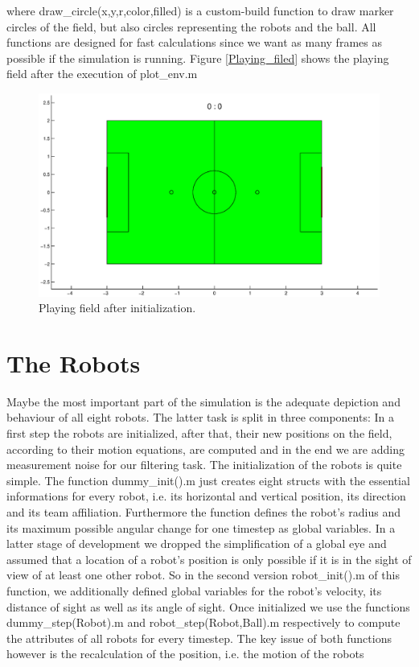 
\parskip 20pt

where {\selectfont draw\_circle(x,y,r,color,filled)} is a custom-build function to draw marker circles of the field, but also circles representing the robots and the ball. All functions are designed for fast calculations since we want as many frames as possible if the simulation is running. Figure \ref{Playing_filed} shows the playing field after the execution of {\selectfont plot\_env.m}
\parskip 10pt

\begin{figure}[htbp]
	\centering
    	\includegraphics[width=12cm]{./2_Simulation/playing_field}
  	\caption{Playing field after initialization.}
  	\label{Playing_field}
\end{figure}


\section{The Robots}

Maybe the most important part of the simulation is the adequate depiction and behaviour of all eight robots. The latter task is split in three components: In a first step the robots are initialized, after that, their new positions on the field, according to their motion equations, are computed and in the end we are adding measurement noise for our filtering task. The initialization of the robots is quite simple. The function {\selectfont dummy\_init().m} just creates eight structs with the essential informations for every robot, i.e. its horizontal and vertical position, its direction and its team affiliation. Furthermore the function defines the robot's radius and its maximum possible angular change for one timestep as global variables. In a latter stage of development we dropped the simplification of a global eye and assumed that a location of a robot's position is only possible if it is in the sight of view of at least one other robot. So in the second version {\selectfont robot\_init().m} of this function, we additionally defined global variables for the robot's velocity, its distance of sight as well as its angle of sight. Once initialized we use the functions {\selectfont dummy\_step(Robot).m} and {\selectfont robot\_step(Robot,Ball).m} respectively to compute the attributes of all robots for every timestep. The key issue of both functions however is the recalculation of the position, i.e. the motion of the robots

